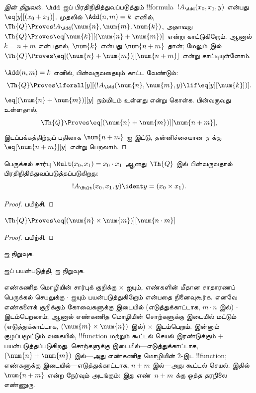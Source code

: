 \documentclass[../../../include/open-logic-section]{subfiles}
\begin{document}
\begin{proof}[ இன் நிறுவல்]
$\Add$ ஐப் பிரதிநிதித்துவப்படுத்தும் !!{formula}~$!A_\Add(x_0, x_1, y)$
என்பது $\eq[y][(x_0 + x_1)]$. முதலில் $\Add(n, m) = k$ எனில்,
$\Th{Q} \Proves !A_\Add(\num{n}, \num{m}, \num{k})$, அதாவது
$\Th{Q} \Proves \eq[\num{k}][(\num{n} + \num{m})]$ என்று காட்டுகிறோம்.
ஆனால் $k = n + m$ என்பதால், $\num{k}$ என்பது $\num{n+m}$ தான்;
மேலும்  இல் $\Th{Q} \Proves
\eq[(\num{n} + \num{m})][\num{n+m}]$ என்று காட்டியுள்ளோம்.

$\Add(n, m) = k$ எனில், பின்வருவதையும் காட்ட வேண்டும்:
\[
\Th{Q} \Proves \lforall[y][(!A_\Add(\num{n}, \num{m}, y) \lif
  \eq[y][\num{k}])].
\]
$\eq[(\num{n} + \num{m})][y]$ நம்மிடம் உள்ளது என்று கொள்க.
பின்வருவது உள்ளதால்,
\[
\Th{Q} \Proves \eq[(\num{n}+\num{m})][\num{n+m}],
\]
இடப்பக்கத்திற்குப் பதிலாக $\num{n+m}$ ஐ இட்டு, தன்னிச்சையான~$y$ க்கு
$\eq[\num{n+m}][y]$ என்று பெறலாம்.
\end{proof}

\begin{prop}
பெருக்கல் சார்பு $\Mult(x_0, x_1) = x_0 \cdot x_1$ ஆனது~$\Th{Q}$ இல்
பின்வருவதால் பிரதிநிதித்துவப்படுத்தப்படுகிறது:
\[
  !A_{\Mult}(x_0, x_1, y) \ident y = (x_0 \times x_1).
\]
\end{prop}

\begin{proof} பயிற்சி. \end{proof}

\begin{lem}
$\Th{Q} \Proves \eq[(\num{n} \times \num{m})][\num{n \cdot m}]$
\end{lem}

\begin{proof} பயிற்சி. \end{proof}

\begin{prob}
 ஐ நிறுவுக.
\end{prob}

\begin{prob}
 ஐப் பயன்படுத்தி,
 ஐ நிறுவுக.
\end{prob}

\begin{explain}
  எண்கணித மொழியின் சார்புக் குறிக்கு $\times$ ஐயும், எண்களின் மீதான
  சாதாரணப் பெருக்கல் செயலுக்கு $\cdot$ ஐயும் பயன்படுத்துகிறோம் என்பதை
  நினைவுகூர்க. எனவே எண்களைக் குறிக்கும் கோவைகளுக்கு இடையில் (எடுத்துக்காட்டாக,
  $m \cdot n$ இல்) $\cdot$ இடம்பெறலாம்; ஆனால் எண்கணித மொழியின் சொற்களுக்கு
  இடையில் மட்டும் (எடுத்துக்காட்டாக, $(\num{m} \times \num{n})$ இல்)
  $\times$ இடம்பெறும். இன்னும் குழப்பமூட்டும் வகையில், !!{function}
  மற்றும் கூட்டல் செயல் இரண்டுக்கும் $+$ பயன்படுத்தப்படுகிறது. சொற்களுக்கு
  இடையில்---எடுத்துக்காட்டாக, $(\num{n} + \num{m})$ இல்---அது எண்கணித
  மொழியின் $2$-இட !!{function}; எண்களுக்கு இடையில்---எடுத்துக்காட்டாக,
  $n+m$ இல்---அது கூட்டல் செயல். இதில் $\num{n+m}$ என்ற நேர்வும் அடங்கும்:
  இது எண்~$n+m$ க்கு ஒத்த தரநிலை எண்ணுரு.
\end{explain}
\end{document}
